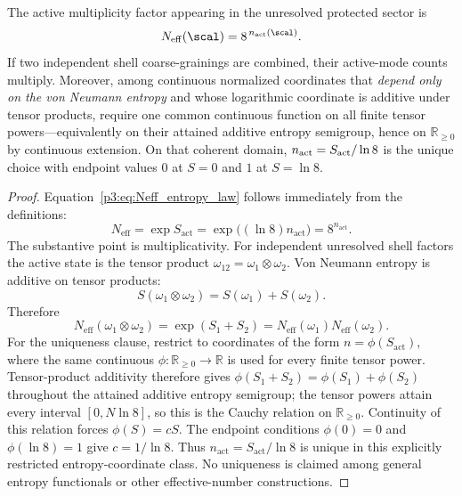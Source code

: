 \documentclass[11pt,a4paper]{article}
\begin{document}
\begin{theorem}
\label{p3:prop:Neff_exp}
The active multiplicity factor appearing in the unresolved protected sector is
\begin{equation}
\label{p3:eq:Neff_entropy_law}
N_{\mathrm{eff}}(\scal)=8^{\,n_{\mathrm{act}}(\scal)}.
\end{equation}
If two independent shell coarse-grainings are combined, their active-mode
counts multiply.  Moreover, among continuous normalized coordinates that
\emph{depend only on the von Neumann entropy} and whose logarithmic coordinate
is additive under tensor products, require one common continuous function on
all finite tensor powers---equivalently on their attained additive entropy
semigroup, hence on \(\mathbb R_{\ge0}\) by continuous extension.  On that
coherent domain, \(n_{\rm act}=S_{\rm act}/\ln8\) is the unique choice with
endpoint values \(0\) at \(S=0\) and \(1\) at \(S=\ln8\).
\end{theorem}

\begin{proof}
Equation~\eqref{p3:eq:Neff_entropy_law} follows immediately from the definitions:
\[
N_{\mathrm{eff}}=\exp S_{\mathrm{act}}
=\exp\bigl((\ln 8)n_{\mathrm{act}}\bigr)=8^{n_{\mathrm{act}}}.
\]
The substantive point is multiplicativity.  For independent unresolved shell factors the active
state is the tensor product $\omega_{12}=\omega_1\otimes\omega_2$.  Von Neumann entropy is additive
on tensor products:
\[
S(\omega_1\otimes\omega_2)=S(\omega_1)+S(\omega_2).
\]
Therefore
\[
N_{\mathrm{eff}}(\omega_1\otimes\omega_2)
=\exp(S_1+S_2)
=N_{\mathrm{eff}}(\omega_1)N_{\mathrm{eff}}(\omega_2).
\]
For the uniqueness clause, restrict to coordinates of the form
\(n=\phi(S_{\mathrm{act}})\), where the same continuous
\(\phi:\mathbb R_{\ge0}\to\mathbb R\) is used for every finite tensor power.
Tensor-product additivity therefore gives
\(\phi(S_1+S_2)=\phi(S_1)+\phi(S_2)\) throughout the attained additive
entropy semigroup; the tensor powers attain every interval
\([0,N\ln8]\), so this is the Cauchy relation on \(\mathbb R_{\ge0}\).
Continuity of this relation
forces \(\phi(S)=cS\).  The endpoint conditions
\(\phi(0)=0\) and \(\phi(\ln8)=1\) give \(c=1/\ln8\).  Thus
\(n_{\mathrm{act}}=S_{\mathrm{act}}/\ln8\) is unique in this explicitly
restricted entropy-coordinate class.  No uniqueness is claimed among general
entropy functionals or other effective-number constructions.
\end{proof}
\end{document}
